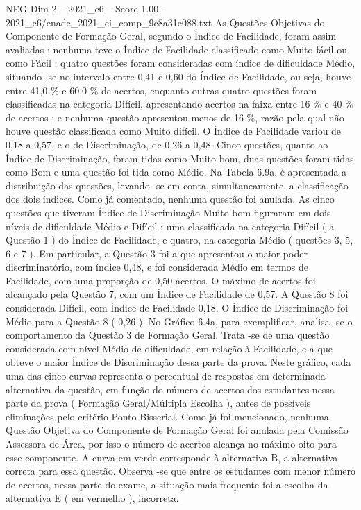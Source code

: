 \begin{textsample}{NEG Dim 2 – 2021\_c6 – Score 1.00 – 2021\_c6/enade\_2021\_ci\_comp\_9c8a31e088.txt}
As Questões Objetivas do Componente de Formação Geral, segundo o Índice de Facilidade, foram assim avaliadas : nenhuma teve o Índice de Facilidade classificado como Muito fácil ou como Fácil ; quatro questões foram consideradas com índice de dificuldade Médio, situando -se no intervalo entre 0,41 e 0,60 do Índice de Facilidade, ou seja, houve entre 41,0 \% e 60,0 \% de acertos, enquanto outras quatro questões foram classificadas na categoria Difícil, apresentando acertos na faixa entre 16 \% e 40 \% de acertos ; e nenhuma questão apresentou menos de 16 \%, razão pela qual não houve questão classificada como Muito difícil.
O Índice de Facilidade variou de 0,18 a 0,57, e o de Discriminação, de 0,26 a 0,48.
Cinco questões, quanto ao Índice de Discriminação, foram tidas como Muito bom, duas questões foram tidas como Bom e uma questão foi tida como Médio.
Na Tabela 6.9a, é apresentada a distribuição das questões, levando -se em conta, simultaneamente, a classificação dos dois índices.
Como já comentado, nenhuma questão foi anulada.
As cinco questões que tiveram Índice de Discriminação Muito bom figuraram em dois níveis de dificuldade Médio e Difícil : uma classificada na categoria Difícil ( a Questão 1 ) do Índice de Facilidade, e quatro, na categoria Médio ( questões 3, 5, 6 e 7 ).
Em particular, a Questão 3 foi a que apresentou o maior poder discriminatório, com índice 0,48, e foi considerada Médio em termos de Facilidade, com uma proporção de 0,50 acertos.
O máximo de acertos foi alcançado pela Questão 7, com um Índice de Facilidade de 0,57.
A Questão 8 foi considerada Difícil, com Índice de Facilidade 0,18.
O Índice de Discriminação foi Médio para a Questão 8 ( 0,26 ).
No Gráfico 6.4a, para exemplificar, analisa -se o comportamento da Questão 3 de Formação Geral.
Trata -se de uma questão considerada com nível Médio de dificuldade, em relação à Facilidade, e a que obteve o maior Índice de Discriminação dessa parte da prova.
Neste gráfico, cada uma das cinco curvas representa o percentual de respostas em determinada alternativa da questão, em função do número de acertos dos estudantes nessa parte da prova ( Formação Geral/Múltipla Escolha ), antes de possíveis eliminações pelo critério Ponto-Bisserial.
Como já foi mencionado, nenhuma Questão Objetiva do Componente de Formação Geral foi anulada pela Comissão Assessora de Área, por isso o número de acertos alcança no máximo oito para esse componente.
A curva em verde corresponde à alternativa B, a alternativa correta para essa questão.
Observa -se que entre os estudantes com menor número de acertos, nessa parte do exame, a situação mais frequente foi a escolha da alternativa E ( em vermelho ), incorreta.

\end{textsample}
